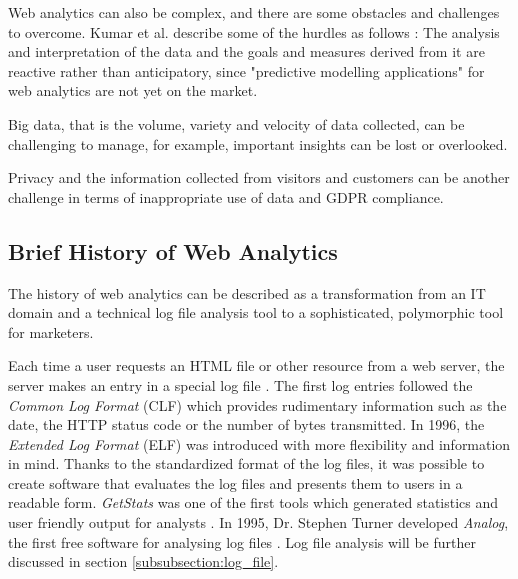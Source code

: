 
Web analytics can also be complex, and there are some obstacles and challenges to overcome.
Kumar et al. describe some of the hurdles as follows \cite{2019Kumar}:
The analysis and interpretation of the data and the goals and measures derived from it are reactive rather than anticipatory, since "predictive modelling applications" for web analytics are not yet on the market.

Big data, that is the volume, variety and velocity of data collected, can be challenging to manage,
for example, important insights can be lost or overlooked.

Privacy and the information collected from visitors and customers can be another challenge in terms of inappropriate use of data and GDPR compliance.





\subsection{Brief History of Web Analytics} %
\label{subsection:web_analytics_history}

The history of web analytics can be described as a transformation from an IT domain and a technical log file analysis tool to a sophisticated, polymorphic tool for marketers.


Each time a user requests an HTML file or other resource from a web server, the server makes an entry in a special log file \cite{2014Singal}.
The first log entries followed the \textit{Common Log Format} (CLF) which provides rudimentary information such as the date, the HTTP status code or the number of bytes transmitted.
In 1996, the \textit{Extended Log Format} (ELF) was introduced with more flexibility and information in mind.
Thanks to the standardized format of the log files, it was possible to create software that evaluates the log files and presents them to users in a readable form.
\textit{GetStats} was one of the first tools which generated statistics and user friendly output for analysts \cite{2009Croll}. %
In 1995, Dr. Stephen Turner developed \textit{Analog}, the first free software for analysing log files \cite{2015Zheng}.
Log file analysis will be further discussed in section \ref{subsubsection:log_file}.


